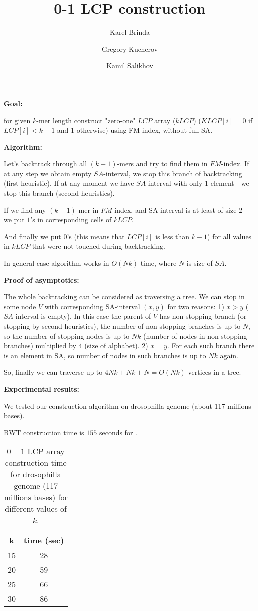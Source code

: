 \documentclass[12pt]{article}
\begin{document}
\thispagestyle{empty}

\title{0-1 LCP construction}
\author{Karel Brinda \and Gregory Kucherov \and Kamil Salikhov}
\maketitle

{\bf Goal:} 

for given $k$-mer length construct "zero-one" $LCP$ array ($kLCP$) ($KLCP[i] = 0$ if $LCP[i] < k-1$ and $1$ otherwise) using FM-index, without full SA.

{\bf Algorithm:}

Let's backtrack through all $(k-1)$-mers and try to find them in $FM$-index. If at any step we obtain empty $SA$-interval, we stop this branch of backtracking (first heuristic).
If at any moment we have $SA$-interval with only 1 element - we stop this branch (second heuristics).

If we find any $(k-1)$-mer in $FM$-index, and SA-interval is at least of size $2$ - we put $1$'s in corresponding cells of $kLCP$.

And finally we put $0$'s (this means that $LCP[i]$ is less than $k-1$) for all values in $kLCP$ that were not touched during backtracking.

In general case algorithm works in $O(Nk)$ time, where $N$ is size of $SA$.

{\bf Proof of asymptotics:} 

The whole backtracking can be considered as traversing a tree. We can stop in some node $V$ with corresponding SA-interval $(x, y)$ for two reasons: 
1) $x > y$ ($SA$-interval is empty). In this case the parent of $V$ has non-stopping branch (or stopping by second heuristics), the number of non-stopping branches is up to $N$, so the number of stopping nodes is up to $Nk$ (number of nodes in non-stopping branches) multiplied by $4$ (size of alphabet).
2) $x = y$. For each such branch there is an element in SA, so number of nodes in such branches is up to $Nk$ again. 

So, finally we can traverse up to $4Nk + Nk + N = O(Nk)$ vertices in a tree. 

{\bf Experimental results:}

We tested our construction algorithm on drosophilla genome (about 117 millions bases).

BWT construction time is $155$ seconds for .


\begin{table}[!tb]
\caption{
$0-1$ LCP array construction time for drosophilla genome (117 millions bases) for different values of $k$.
\label{tab:constr_time}}
\centering
\begin{tabular}{| c | c | }
  \hline
  k & time (sec) \\ 
  \hline
  15 & 28 \\
  \hline
  20 & 59 \\
  \hline
  25 & 66 \\
  \hline
  30 & 86 \\
  \hline
\end{tabular}
\end{table}
\end{document}
